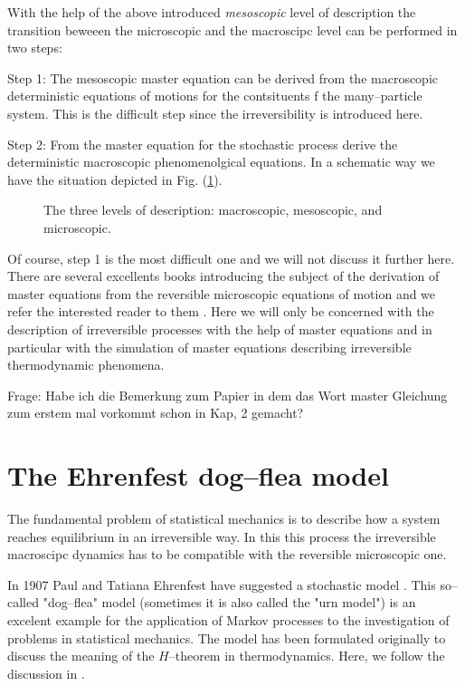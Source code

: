 With the help of the above introduced \textit{mesoscopic} level of description
the transition beweeen the microscopic and the macroscipc level can be
performed in two steps:

Step 1: The mesoscopic master equation can be derived from the macroscopic
deterministic equations of motions for the contsituents f the many--particle
system. This is the difficult step since the irreversibility is introduced
here. 

Step 2: From the master equation for the stochastic process derive the
deterministic macroscopic phenomenolgical equations. In a schematic way we
have the situation depicted in Fig. (\ref{fig:MasterSchema}).

\begin{figure}[htbp]
 \label{fig:MasterSchema} 
 \begin{center}
    
    \caption{The three levels of description: macroscopic, mesoscopic, 
and microscopic.}
    
  \end{center}
\end{figure}

Of course, step 1 is the most difficult one and we will not discuss it further
here. There are several excellents books introducing the subject of the
derivation of master equations from the reversible microscopic equations of
motion and we refer the interested reader to them
\cite{Prigogine,Kreuzer,McLennan}. 
Here we will only be
concerned with the description of irreversible processes with the 
help of master equations and in particular with the simulation of 
master equations describing
irreversible thermodynamic phenomena. 

Frage: Habe ich die Bemerkung zum Papier in dem das Wort master Gleichung zum
erstem mal vorkommt schon in Kap, 2 gemacht?


\section{The Ehrenfest dog--flea model}
\label{sec:EhrenfestModel}
The fundamental problem of statistical mechanics is to describe 
how a system reaches
equilibrium in an irreversible way. In this this process the irreversible
macroscipc dynamics has to be compatible with the reversible microscopic one.

In 1907 Paul and Tatiana Ehrenfest have suggested a stochastic model
\cite{Ehrenfest}. This so--called "dog--flea" model (sometimes it is also
called the "urn model") is an excelent example for the application of Markov
processes to the investigation of problems in statistical mechanics. The model
has been formulated originally to discuss the meaning of the $H$--theorem in
thermodynamics. Here, we follow the discussion in \cite{Jancel,KacLogan}.

